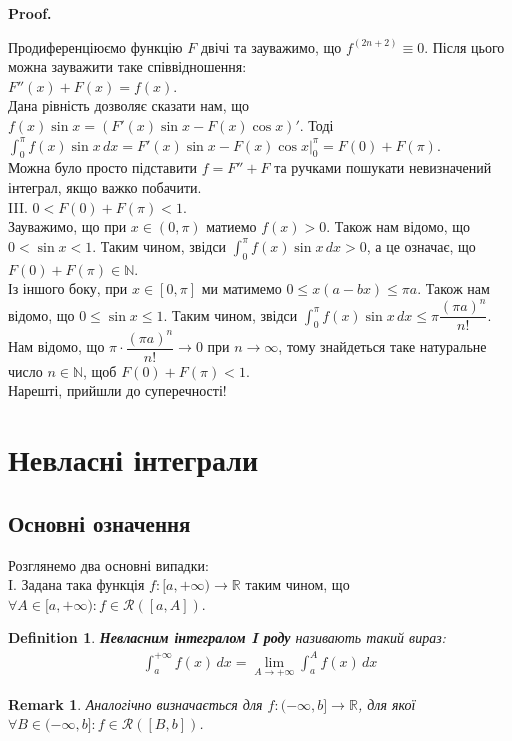 \documentclass[a4paper, 10pt]{article}
\makeatletter
\theoremstyle{theoremdd}
\theoremstyle{theoremdd}
\theoremstyle{theoremdd}
\newtheorem{definition}[theorem]{Definition}
\theoremstyle{theoremdd}
\theoremstyle{theoremdd}
\theoremstyle{theoremdd}
\theoremstyle{theoremdd}
\newtheorem{remark}[theorem]{Remark}
\theoremstyle{theoremdd}
\theoremstyle{theoremdd}
\renewenvironment{proof}[1][Proof.\\]{\par
\pushQED{\hfill \qed}%
\normalfont \topsep6\p@\@plus6\p@\relax
\trivlist
\item\relax
{\bfseries
#1\@addpunct{.}}\hspace\labelsep\ignorespaces
}{%
\popQED\endtrivlist\@endpefalse
}
\makeatother
\begin{document}
\begin{proof}
Продиференціюємо функцію $F$ двічі та зауважимо, що $f^{(2n+2)} \equiv 0$. Після цього можна зауважити таке співвідношення:\\
$F''(x) + F(x) = f(x)$.\\
Дана рівність дозволяє сказати нам, що $f(x) \sin x = (F'(x) \sin x - F(x) \cos x)'$. Тоді\\
$\displaystyle\int_0^{\pi} f(x)\sin x\,dx = F'(x) \sin x - F(x) \cos x \Big|_{0}^{\pi} = F(0) + F(\pi)$.\\
Можна було просто підставити $f = F'' + F$ та ручками пошукати невизначений інтеграл, якщо важко побачити.
\bigskip \\
III. \textit{$0 < F(0) + F(\pi) < 1$}.\\
Зауважимо, що при $x \in (0,\pi)$ матиемо $f(x) > 0$. Також нам відомо, що $0 < \sin x < 1$. Таким чином, звідси $\displaystyle\int_0^{\pi} f(x) \sin x\,dx > 0$, а це означає, що $F(0) + F(\pi) \in \mathbb{N}$.\\
Із іншого боку, при $x \in [0,\pi]$ ми матимемо $0 \leq x(a-bx) \leq \pi a$. Також нам відомо, що $0 \leq \sin x \leq 1$. Таким чином, звідси $\displaystyle\int_0^{\pi} f(x) \sin x\,dx \leq \pi \dfrac{(\pi a)^n}{n!}$. Нам відомо, що $\pi \cdot \dfrac{(\pi a)^n}{n!} \to 0$ при $n \to \infty$, тому знайдеться таке натуральне число $n \in \mathbb{N}$, щоб $F(0) + F(\pi) < 1$.
\bigskip \\
Нарешті, прийшли до суперечності!
\end{proof}
\newpage

\section{Невласні інтеграли}
\subsection{Основні означення}
Розглянемо два основні випадки:
\bigskip \\
I. Задана така функція $f \colon [a,+\infty) \to \mathbb{R}$ таким чином, що $\forall A \in [a,+\infty): f \in \mathcal{R}([a,A])$.
\begin{definition}
\textbf{Невласним інтегралом I роду} називають такий вираз:
\begin{align*}
\int_a^{+\infty} f(x)\,dx = \lim_{A \to +\infty} \int_a^A f(x)\,dx
\end{align*}
\end{definition}

\begin{remark}
Аналогічно визначається для $f \colon (-\infty,b] \to \mathbb{R}$, для якої $\forall B \in (-\infty,b]: f \in \mathcal{R}([B,b])$.
\end{remark}
\end{document}

